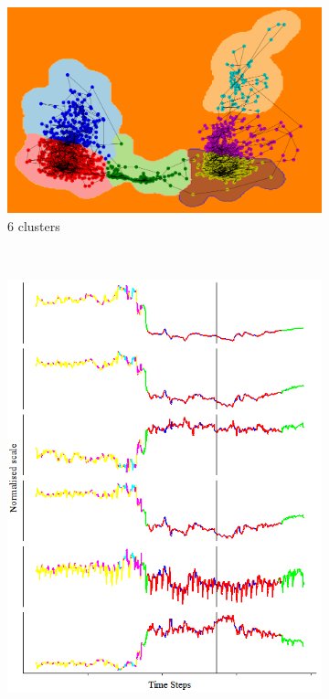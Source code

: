 \documentclass[runningheads]{llncs}
\begin{document}
\begin{figure}[H]
	\begin{subfigure}[b]{0.5\textwidth}
		\includegraphics[width=\textwidth]{pca_cluster_6.PNG}
		\caption{\(6\) clusters}
		\label{fig:pca_cluster_6}
	\end{subfigure}
	~
	\begin{subfigure}[b]{0.25\textwidth}
		\includegraphics[width=\textwidth]{context_timeline_6.PNG}
		\label{fig:context_timeline_6}
	\end{subfigure}
	

\end{figure}
\end{document}
